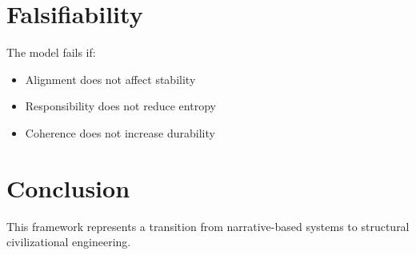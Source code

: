 \documentclass[11pt]{article}
\begin{document}
\section{Falsifiability}

The model fails if:

\begin{itemize}
\item Alignment does not affect stability
\item Responsibility does not reduce entropy
\item Coherence does not increase durability
\end{itemize}

\section{Conclusion}

This framework represents a transition from narrative-based systems to structural civilizational engineering.
\end{document}
